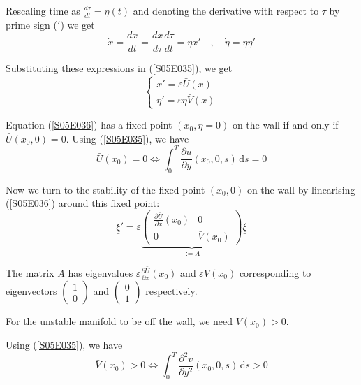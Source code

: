 \documentclass[twoside,10pt,a4paper]{article}
\begin{document}
Rescaling time as $\displaystyle \frac{d\tau}{dt}=\eta(t)$ and denoting the derivative with respect to $\tau$ by prime sign ($'$) we get
\begin{equation*}
	\dot{x} = \frac{dx}{dt} = \frac{dx}{d\tau}\frac{d\tau}{dt} = \eta x' \quad , \quad \dot{\eta}= \eta \eta'
\end{equation*}

Substituting these expressions in (\ref{S05E035}), we get
\begin{equation}\label{S05E036}
	\begin{cases}
		x' = \varepsilon \bar{U}(x) \\
		\eta' = \varepsilon \eta \bar{V}(x)
	\end{cases}
\end{equation}

Equation (\ref{S05E036}) has a fixed point $(x_0, \eta=0)$ on the wall if and only if $\bar{U}(x_0,0)=0$. Using (\ref{S05E035}), we have
\begin{equation}\label{S05E037}
	\bar{U}(x_0) = 0 \Longleftrightarrow \boxed{\int_0^T \frac{\partial u}{\partial y}(x_0,0,s)\,\text{d}s = 0}
\end{equation}

Now we turn to the stability of the fixed point $(x_0,0)$ on the wall by linearising (\ref{S05E036}) around this fixed point:
\begin{equation*}
	\underline{\xi}' = \varepsilon \underbrace{\begin{pmatrix}
		\displaystyle \frac{\partial \bar{U}}{\partial x}(x_0) & 0 \\
		0 & \displaystyle \bar{V}(x_0)
	\end{pmatrix}}_{:=A} \underline{\xi}
\end{equation*}

The matrix $A$ has eigenvalues $\displaystyle \varepsilon \frac{\partial \bar{U}}{\partial x}(x_0)$ and $\varepsilon \bar{V}(x_0)$ corresponding to eigenvectors $\displaystyle \begin{pmatrix} 1 \\ 0 \end{pmatrix}$ and $\displaystyle \begin{pmatrix} 0 \\ 1 \end{pmatrix}$ respectively.

For the unstable manifold to be off the wall, we need $\bar{V}(x_0)>0$.

Using (\ref{S05E035}), we have
\begin{equation}\label{S05E038}
	\bar{V}(x_0) > 0 \Longleftrightarrow \boxed{\int_0^T \frac{\partial^2 v}{\partial y^2}(x_0,0,s)\,\text{d}s > 0}
\end{equation}
\end{document}
